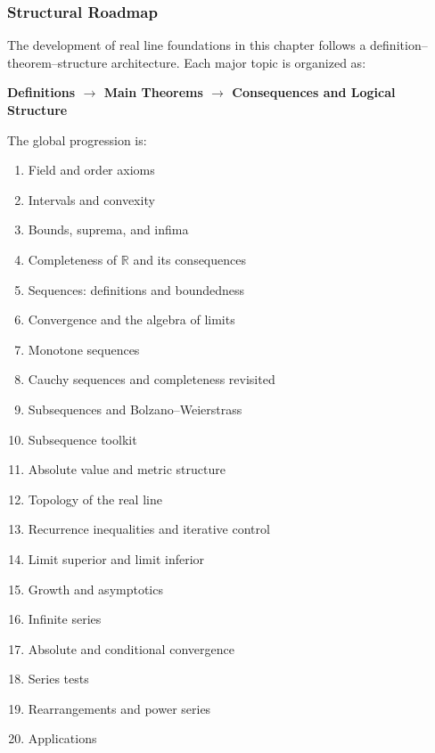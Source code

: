 \subsubsection*{Structural Roadmap}
The development of real line foundations in this chapter follows a
definition--theorem--structure architecture.
Each major topic is organized as:
\begin{center}
\textbf{Definitions $\longrightarrow$ Main Theorems $\longrightarrow$ Consequences and Logical Structure}
\end{center}
The global progression is:
\begin{enumerate}
  \item Field and order axioms
  \item Intervals and convexity
  \item Bounds, suprema, and infima
  \item Completeness of $\mathbb{R}$ and its consequences
  \item Sequences: definitions and boundedness
  \item Convergence and the algebra of limits
  \item Monotone sequences
  \item Cauchy sequences and completeness revisited
  \item Subsequences and Bolzano--Weierstrass
  \item Subsequence toolkit
  \item Absolute value and metric structure
  \item Topology of the real line
  \item Recurrence inequalities and iterative control
  \item Limit superior and limit inferior
  \item Growth and asymptotics
  \item Infinite series
  \item Absolute and conditional convergence
  \item Series tests
  \item Rearrangements and power series
  \item Applications
\end{enumerate}
\vspace{1em}




